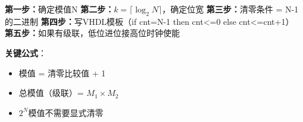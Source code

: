 \begin{examtip}[计数器类题目的统一解法]
\textbf{第一步：}确定模值N
\textbf{第二步：}$k = \lceil \log_2 N \rceil$，确定位宽
\textbf{第三步：}清零条件 = N-1 的二进制
\textbf{第四步：}写VHDL模板（if cnt=N-1 then cnt<=0 else cnt<=cnt+1）
\textbf{第五步：}如果有级联，低位进位接高位时钟使能

\textbf{关键公式}：
\begin{itemize}
  \item 模值 = 清零比较值 + 1
  \item 总模值（级联）= $M_1 \times M_2$
  \item $2^N$模值不需要显式清零
\end{itemize}
\end{examtip}
